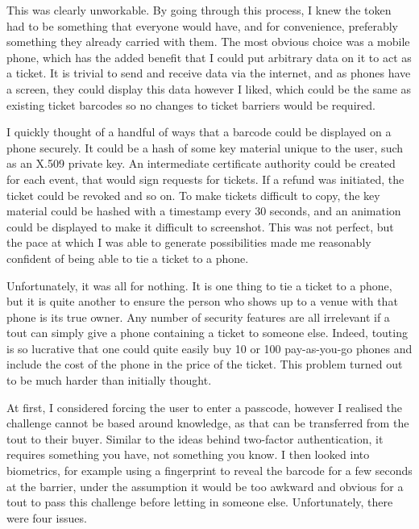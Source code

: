 \documentclass[12pt,a4paper]{bhamdissertation}
\begin{document}
This was clearly unworkable. By going through this process, I knew the token had to be something that everyone would have, and for convenience, preferably something they already carried with them. The most obvious choice was a mobile phone, which has the added benefit that I could put arbitrary data on it to act as a ticket. It is trivial to send and receive data via the internet, and as phones have a screen, they could display this data however I liked, which could be the same as existing ticket barcodes so no changes to ticket barriers would be required.

I quickly thought of a handful of ways that a barcode could be displayed on a phone securely. It could be a hash of some key material unique to the user, such as an X.509 private key. An intermediate certificate authority could be created for each event, that would sign requests for tickets. If a refund was initiated, the ticket could be revoked and so on. To make tickets difficult to copy, the key material could be hashed with a timestamp every 30 seconds, and an animation could be displayed to make it difficult to screenshot. This was not perfect, but the pace at which I was able to generate possibilities made me reasonably confident of being able to tie a ticket to a phone.

Unfortunately, it was all for nothing. It is one thing to tie a ticket to a phone, but it is quite another to ensure the person who shows up to a venue with that phone is its true owner. Any number of security features are all irrelevant if a tout can simply give a phone containing a ticket to someone else. Indeed, touting is so lucrative that one could quite easily buy 10 or 100 pay-as-you-go phones and include the cost of the phone in the price of the ticket. This problem turned out to be much harder than initially thought.

At first, I considered forcing the user to enter a passcode, however I realised the challenge cannot be based around knowledge, as that can be transferred from the tout to their buyer. Similar to the ideas behind two-factor authentication, it requires something you have, not something you know. I then looked into biometrics, for example using a fingerprint to reveal the barcode for a few seconds at the barrier, under the assumption it would be too awkward and obvious for a tout to pass this challenge before letting in someone else. Unfortunately, there were four issues.
\end{document}
